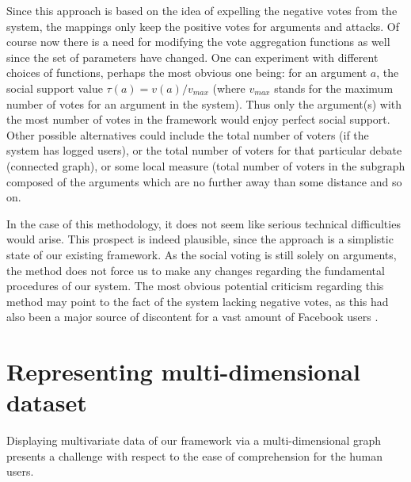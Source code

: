 \documentclass{article}
\begin{document}
Since this approach is based on the idea of expelling the negative votes from the system, the mappings only keep the positive votes for arguments and attacks. Of course now there is a need for modifying the vote aggregation functions as well since the set of parameters have changed. One can experiment with different choices of functions, perhaps the most obvious one being: for an argument $a$, the social support value $\tau(a) = v(a) / v_{max}$ (where  $v_{max}$ stands for the maximum number of votes for an argument in the system). Thus only the argument(s) with the most number of votes in the framework would enjoy perfect social support. Other possible alternatives could include the total number of voters (if the system has logged users), or the total number of voters for that particular debate (connected graph), or some local measure (total number of voters in the subgraph composed of the arguments which are no further away than some distance and so on.


In the case of this methodology, it does not seem like serious technical difficulties would arise. This prospect is indeed plausible, since the approach is a simplistic state of our existing framework. As the social voting  is still solely on arguments, the method does not force us to make any changes regarding the fundamental procedures of our system.
The most obvious potential criticism regarding this method  may point to the fact of the system lacking negative votes, as this had also been a major source of discontent for a vast amount of Facebook users \cite{FBdislike}. 


\section{Representing multi-dimensional dataset} 
Displaying multivariate data of our framework via a multi-dimensional graph presents a challenge with respect to the ease of comprehension for the human users.
\end{document}
